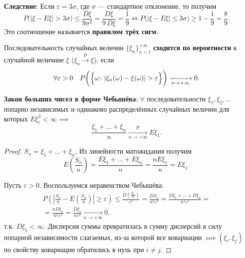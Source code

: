\textbf{Следствие}:
Если $\varepsilon = 3\sigma$, где $\sigma$ --- стандартное отклонение, то получим
\begin{equation*}
    P\bigl( |\xi-E \xi|> 3 \sigma \bigr) \leqslant 
    \frac{D \xi}{9 \sigma^2} = 
    \frac{D \xi}{9 \, D \xi} =
    \frac{1}{9} \iff 
    P\bigl( |\xi-E \xi| \leqslant 3 \sigma \bigr) \geqslant 
    1-\frac{1}{9} = 
    \frac{8}{9}.
\end{equation*}
Это соотношение называется \textbf{правилом трёх сигм}.

Последовательность случайных величин $\{\xi_n\}_{n = 1}^{+\infty}$ 
\textbf{сходится по вероятности} к случайной величине $\xi$ ($\xi_n \xrightarrow[]{\text{P}} \xi$), если
$$
    \forall \varepsilon>0 \quad P \biggl( \Bigl\{ \omega \colon |\xi_{n}(\omega)-\xi(\omega)|>\varepsilon \Bigr\} \biggr) \xrightarrow[n \to +\infty]{} 0.
$$

\textbf{Закон больших чисел в форме Чебышёва}:
$\forall$ последовательности $\xi_1, \xi_2, \ldots$ попарно независимых и одинаково распределённых случайных величин для которых $E \xi_i^2 < \infty \implies$ 
\begin{equation*}
    \frac{\xi_{1}+\ldots+\xi_{n}}{n} \xrightarrow[n \to + \infty]{\text{P}} E \xi_{1}.
\end{equation*}


\begin{proof}
    $S_n = \xi_1 + \ldots + \xi_n$, Из линейности матожидания получим
    \begin{equation*}
        E \left(\frac{S_{n}}{n}\right)=\frac{E \xi_{1}+\ldots+E \xi_{n}}{n}=\frac{n E \xi_{1}}{n}=E \xi_{1}.
    \end{equation*}
    
    Пусть $\varepsilon > 0$. Воспользуемся неравенством Чебышёва:
    \begin{multline*}
        P\left(\left|\frac{S_{n}}{n}-E \left(\frac{S_{n}}{n}\right)\right| \geqslant \varepsilon\right) \leqslant \frac{D\left(\frac{S_{n}}{n}\right)}{\varepsilon^{2}}
        = \frac{D S_{n}}{n^{2} \varepsilon^{2}}
        = \frac{D \xi_{1}+\ldots+D \xi_{n}}{n^{2} \varepsilon^{2}}= \\
        = \frac{n D \xi_{1}}{n^{2} \varepsilon^{2}}
        = \frac{D \xi_{1}}{n \varepsilon^{2}} \xrightarrow[n \to +\infty]{} 0,
    \end{multline*}
    т.к. $D\xi_1 < \infty$. Дисперсия суммы превратилась в сумму дисперсий в силу попарной независимости слагаемых, из-за которой все ковариации $\operatorname{cov}(\xi_i, \xi_j)$ по свойству ковариации обратились в нуль при $i \neq j$.
\end{proof}


